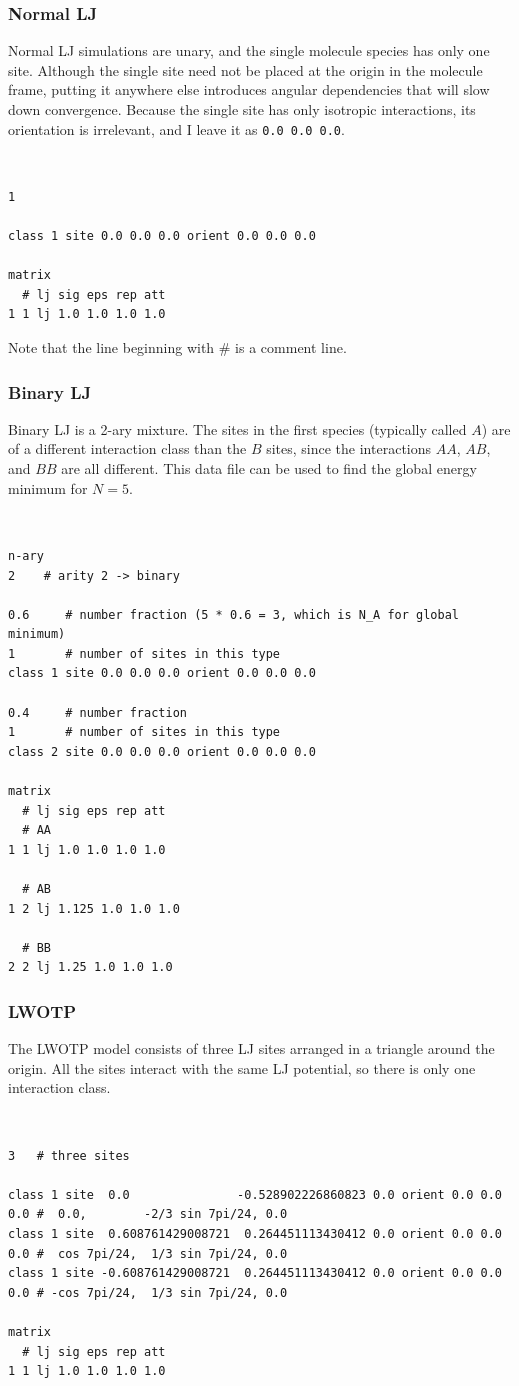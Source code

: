 \documentclass[12pt,a4paper,dvips]{article}
\begin{document}
\subsubsection{Normal LJ}
Normal LJ simulations are unary, and the single molecule species has only one site. Although the single site need not be placed at the origin in the molecule frame, putting it anywhere else introduces angular dependencies that will slow down convergence. Because the single site has only isotropic interactions, its orientation is irrelevant, and I leave it as {\tt 0.0 0.0 0.0}.
{\tt
\begin{verbatim}
1

class 1 site 0.0 0.0 0.0 orient 0.0 0.0 0.0

matrix
  # lj sig eps rep att  
1 1 lj 1.0 1.0 1.0 1.0
\end{verbatim}
}
Note that the line beginning with \# is a comment line.

\subsubsection{Binary LJ}
Binary LJ is a 2-ary mixture. The sites in the first species (typically called $A$) are of a different interaction class than the $B$ sites, since the interactions $AA$, $AB$, and $BB$ are all different. This data file can be used to find the global energy minimum for $N=5$.
{\tt
\begin{verbatim}
n-ary
2    # arity 2 -> binary

0.6     # number fraction (5 * 0.6 = 3, which is N_A for global minimum)
1       # number of sites in this type
class 1 site 0.0 0.0 0.0 orient 0.0 0.0 0.0

0.4     # number fraction
1       # number of sites in this type
class 2 site 0.0 0.0 0.0 orient 0.0 0.0 0.0

matrix
  # lj sig eps rep att  
  # AA
1 1 lj 1.0 1.0 1.0 1.0

  # AB
1 2 lj 1.125 1.0 1.0 1.0

  # BB
2 2 lj 1.25 1.0 1.0 1.0
\end{verbatim}
}

\subsubsection{LWOTP}
The LWOTP model consists of three LJ sites arranged in a triangle around the origin. All the sites interact with the same LJ potential, so there is only one interaction class.
{\tt
\begin{verbatim}
3   # three sites

class 1 site  0.0               -0.528902226860823 0.0 orient 0.0 0.0 0.0 #  0.0,        -2/3 sin 7pi/24, 0.0
class 1 site  0.608761429008721  0.264451113430412 0.0 orient 0.0 0.0 0.0 #  cos 7pi/24,  1/3 sin 7pi/24, 0.0
class 1 site -0.608761429008721  0.264451113430412 0.0 orient 0.0 0.0 0.0 # -cos 7pi/24,  1/3 sin 7pi/24, 0.0

matrix
  # lj sig eps rep att
1 1 lj 1.0 1.0 1.0 1.0
\end{verbatim}
}
\end{document}
